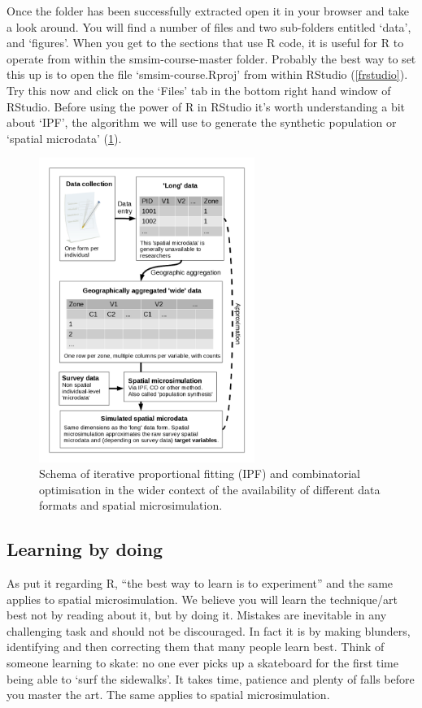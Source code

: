 \documentclass[a4paper, 11pt, twoside]{article}
\begin{document}
Once the folder has been successfully extracted open it in
your browser and take a look around. You will find a number of files
and two sub-folders
entitled `data', and `figures'. When you get to the
sections that use R code, it is useful for R to operate from
within the smsim-course-master folder. Probably the best way
to set this up is to open the file `smsim-course.Rproj' from
within RStudio (\cref{frstudio}).
Try this now and click on the `Files' tab in
the bottom right hand window of RStudio.
Before using the power of R in RStudio it's worth
understanding a bit about `IPF', the algorithm we will use to generate
the synthetic population or `spatial microdata' (\cref{fmsim-schema}).

\begin{figure}[H]
\begin{center}
\includegraphics[width=7cm]{msim-schema}
\end{center}
\caption{Schema of iterative proportional fitting (IPF) and combinatorial
optimisation
in the wider context of the availability of different data formats and spatial
microsimulation. \label{fmsim-schema}}
\end{figure}

\subsection{Learning by doing}
As \citet[xxii]{kabacoff2011r} put it regarding R, ``the best
way to learn is to experiment'' and the same applies to spatial microsimulation.
We believe you will learn the technique/art best not by reading about it, 
but by doing it. Mistakes are inevitable in any challenging task and should not
be discouraged. In fact it is by making blunders, identifying and then correcting them
that many people learn best. Think of someone learning to skate: no one ever
picks up a skateboard for the first time being able to `surf the sidewalks'. It
takes time, patience and plenty of falls before you master the art.
The same applies to spatial microsimulation.
\end{document}
